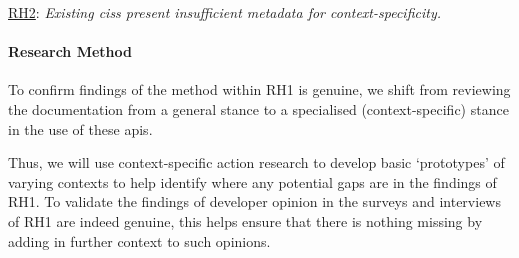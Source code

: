 \begin{titled-frame}{\underline{RH2}: \textit{Existing \glspl{cis} present insufficient metadata for context-specificity.} }
\paragraph{Research Method} To confirm findings of the method within RH1 is genuine, we shift from reviewing the documentation from a general stance to a specialised (context-specific) stance in the use of these \glspl{api}.

Thus, we will use context-specific action research to develop basic `prototypes' of varying contexts to help identify where any potential gaps are in the findings of RH1.
To validate the findings of developer opinion in the surveys and interviews of RH1 are indeed genuine, this helps ensure that there is nothing missing by adding in further context to such opinions.
\end{titled-frame}

